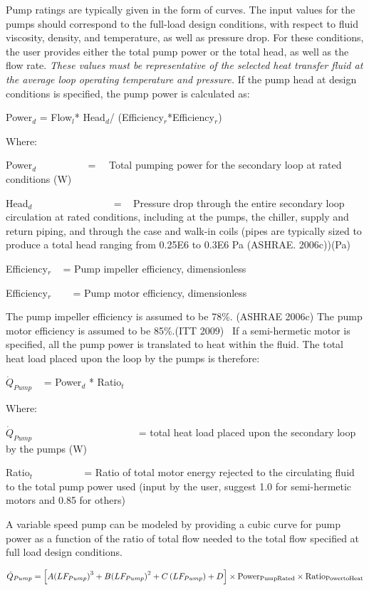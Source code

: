 Pump ratings are typically given in the form of curves. The input values for the pumps should correspond to the full-load design conditions, with respect to fluid viscosity, density, and temperature, as well as pressure drop. For these conditions, the user provides either the total pump power or the total head, as well as the flow rate. \emph{These values must be representative of the selected heat transfer fluid at the average loop operating temperature and pressure.} If the pump head at design conditions is specified, the pump power is calculated as:

Power\(_{d}\) = Flow\(_{l}\)* Head\(_{d}\)/ (Efficiency\(_{r}\)*Efficiency\(_{r}\))

Where:

Power\(_{d}\) ~~~~~~~~~ = ~~Total pumping power for the secondary loop at rated conditions (W)

Head\(_{d}\)~~~~~~~~ ~~~~~~~ = ~ Pressure drop through the entire secondary loop circulation at rated conditions, including at the pumps, the chiller, supply and return piping, and through the case and walk-in coils (pipes are typically sized to produce a total head ranging from 0.25E6 to 0.3E6 Pa (ASHRAE. 2006c))(Pa)

Efficiency\(_{r}\) ~ = Pump impeller efficiency, dimensionless

Efficiency\(_{r}\)~~ ~ = Pump motor efficiency, dimensionless

The pump impeller efficiency is assumed to be 78\%. (ASHRAE 2006c) The pump motor efficiency is assumed to be 85\%.(ITT 2009)~ If a semi-hermetic motor is specified, all the pump power is translated to heat within the fluid. The total heat load placed upon the loop by the pumps is therefore:

\({\dot Q_{Pump}}\) ~ = Power\(_{d}\) * Ratio\(_{t}\)

Where:

\({\dot Q_{Pump}}\) ~~~~~~~~~~~~~~~~~~~~ = total heat load placed upon the secondary loop by the pumps (W)

Ratio\(_{t}\) ~~~~~~~~~ = Ratio of total motor energy rejected to the circulating fluid to the total pump power used (input by the user, suggest 1.0 for semi-hermetic motors and 0.85 for others)

A variable speed pump can be modeled by providing a cubic curve for pump power as a function of the ratio of total flow needed to the total flow specified at full load design conditions.

\begin{equation}
{\dot Q_{Pump}} = \left[ {A{{\left( {L{F_{Pump}}} \right)}^3} + B{{\left( {L{F_{Pump}}} \right)}^2} + C\left( {L{F_{Pump}}} \right) + D} \right] \times {\rm{Powe}}{{\rm{r}}_{{\rm{PumpRated}}}} \times {\rm{Rati}}{{\rm{o}}_{{\rm{PowertoHeat}}}}
\end{equation}

